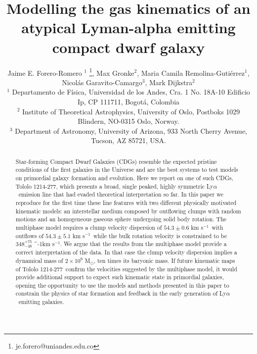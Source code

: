 \documentclass[a4paper,fleqn,usenatbib]{mnras}
\newcommand{\tol}{Tololo 1214-277}
\newcommand{\lya}{\ifmmode{{\rm Ly}\alpha}\else Ly$\alpha$\ \fi}
\newcommand{\kms}{\ifmmode\mathrm{km\ s}^{-1}\else km s$^{-1}$\fi}
\newcommand{\sigmaclump}{$54.3\pm 0.6$ km s$^{-1}$}
\newcommand{\inftyclump}{$54.3\pm 5.1$ km s$^{-1}$}
\begin{document}
\title[An atypical \lya dwarf galaxy]{
Modelling the gas kinematics of an atypical Lyman-alpha emitting compact dwarf galaxy}
\author[J.E. Forero-Romero et al.]
{Jaime E. Forero-Romero $^{1}$ \thanks{je.forero@uniandes.edu.co},
Max Gronke$^2$, 
Maria Camila Remolina-Guti\'errez$^1$,
\newauthor
Nicol\'as Garavito-Camargo$^3$, 
Mark Dijkstra$^2$\\
$^1$ Departamento de F\'isica, Universidad de los Andes, Cra. 1
  No. 18A-10 Edificio Ip, CP 111711, Bogot\'a, Colombia \\
$^2$ Institute of Theoretical Astrophysics, University of Oslo,
Postboks 1029 Blindern, NO-0315 Oslo, Norway.\\
$^3$ Department of Astronomy, University of Arizona, 933 North Cherry
Avenue, Tucson, AZ 85721, USA. 
}


\maketitle


\begin{abstract}
	
Star-forming Compact Dwarf Galaxies (CDGs) 
resemble the expected pristine conditions of the first galaxies in the
Universe and are the best systems to test models on primordial galaxy
formation and evolution. 
Here we report on one of such CDGs, \tol, which presents
a broad, single peaked, highly symmetric \lya emission line that had
evaded theoretical interpretation so far.  
In this paper we reproduce for the first time these line features with two
different physically motivated kinematic models: 
an interstellar medium composed by outflowing clumps with 
random motions and an homogeneous gaseous sphere undergoing solid body
rotation.
The multiphase model requires a clump velocity dispersion of
\sigmaclump\ with outflows of \inftyclump\, while the
bulk rotation velocity is constrained to be $348^{+75}_{-48}$ \kms.
We argue that the results from the multiphase model 
provide a correct interpretation of the data.
In that case the clump velocity dispersion implies a dynamical mass of
$2\times 10^{9}$ M$_{\odot}$,  ten times its baryonic mass.
If future kinematic maps of \tol\ confirm the velocities suggested by
the multiphase model, it would provide additional support to expect
such kinematic state in primordial galaxies, opening
the opportunity to use the models and methods presented in this
  paper to constrain the physics of star formation and feedback in the
  early generation of \lya emitting galaxies.
\end{abstract}
\end{document}
